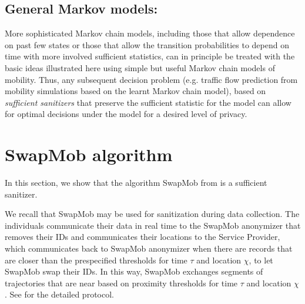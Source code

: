 \documentclass[times,twocolumn,final,authoryear]{elsarticle}
\begin{document}
\subsection{General Markov models:}
More sophisticated Markov chain models, including those that allow dependence on past few states or those that allow the transition probabilities to depend on time with more involved sufficient statistics, can in principle be treated with the basic ideas illustrated here using simple but useful Markov chain models of mobility. 
Thus, any subsequent decision problem (e.g. traffic flow prediction from mobility simulations based on the learnt Markov chain model), based on {\em sufficient sanitizers} that preserve the sufficient statistic for the model can allow for optimal decisions under the model for a desired level of privacy. 


\section{SwapMob algorithm}\label{Sec:swapmob}

In this section, we show that the algorithm SwapMob from \cite{Salas:2018-c} is a sufficient sanitizer.

We recall that SwapMob may be used for sanitization during data collection.
The individuals communicate their data in real time to the SwapMob anonymizer that removes their IDs and communicates their locations to the Service Provider, which communicates back to SwapMob anonymizer when there are records that are closer than the prespecified thresholds for time $\tau$ and location $\chi$, to let SwapMob swap their IDs.
In this way, SwapMob exchanges segments of trajectories that are near based on proximity thresholds for time $\tau$ and location $\chi$. See \cite{Salas:2018-c} for the detailed protocol.
%


%
\end{document}

